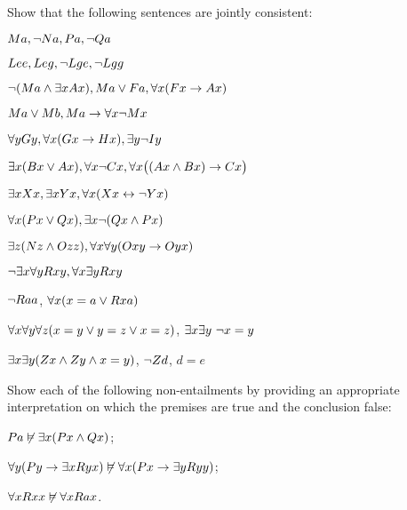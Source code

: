 \problempart
Show that the following sentences are jointly consistent:
\begin{earg}
\item $Ma, \neg Na, Pa, \neg Qa$
\item $Lee, Leg, \neg Lge, \neg Lgg$
\item $\neg (Ma \wedge \exists x Ax), Ma \vee Fa, \forall x(Fx \rightarrow Ax)$
\item $Ma \vee Mb, Ma \rightarrow \forall x \neg Mx$
\item $\forall y Gy, \forall x (Gx \rightarrow Hx), \exists y \neg Iy$
\item $\exists x(Bx \vee Ax), \forall x \neg Cx, \forall x\bigl( (Ax \wedge Bx) \rightarrow Cx\bigr)$
\item $\exists x Xx, \exists x Yx, \forall x(Xx \leftrightarrow \neg Yx)$
\item $\forall x(Px \vee Qx), \exists x\neg(Qx \wedge Px)$
\item $\exists z(Nz \wedge Ozz), \forall x\forall y(Oxy \rightarrow Oyx)$
\item $\neg \exists x \forall y Rxy, \forall x \exists y Rxy$
\item $\neg Raa$, $\forall x (x=a \vee Rxa)$
\item $\forall x\forall y\forall z(x=y \vee y=z \vee x=z)$, $\exists x\exists y\ \neg x= y$
\item $\exists x\exists y(Zx \wedge Zy \wedge x=y)$, $\neg Zd$, $d=e$
\end{earg}

\problempart Show each of the following non-entailments by providing an appropriate interpretation on which the premises are true and the conclusion false: \begin{earg}
\item $Pa\not\vDash\exists x(Px\wedge Qx)$;
\item  $\forall y(Py\rightarrow \exists x Ryx)\not\vDash\forall x(Px\rightarrow \exists yRyy)$;
\item  $\forall x Rxx\not\vDash\forall x Rax$.
\end{earg}


